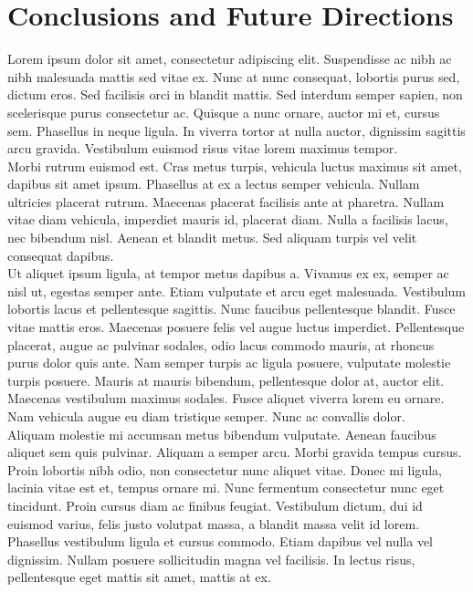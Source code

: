 \documentclass[12pt]{report}
\begin{document}
\chapter{Conclusions and Future Directions}
\bigskip
Lorem ipsum dolor sit amet, consectetur adipiscing elit. Suspendisse ac nibh ac nibh malesuada mattis sed vitae ex. Nunc at nunc consequat, lobortis purus sed, dictum eros. Sed facilisis orci in blandit mattis. Sed interdum semper sapien, non scelerisque purus consectetur ac. Quisque a nunc ornare, auctor mi et, cursus sem. Phasellus in neque ligula. In viverra tortor at nulla auctor, dignissim sagittis arcu gravida. Vestibulum euismod risus vitae lorem maximus tempor.\\

\noindent Morbi rutrum euismod est. Cras metus turpis, vehicula luctus maximus sit amet, dapibus sit amet ipsum. Phasellus at ex a lectus semper vehicula. Nullam ultricies placerat rutrum. Maecenas placerat facilisis ante at pharetra. Nullam vitae diam vehicula, imperdiet mauris id, placerat diam. Nulla a facilisis lacus, nec bibendum nisl. Aenean et blandit metus. Sed aliquam turpis vel velit consequat dapibus.\\

\noindent Ut aliquet ipsum ligula, at tempor metus dapibus a. Vivamus ex ex, semper ac nisl ut, egestas semper ante. Etiam vulputate et arcu eget malesuada. Vestibulum lobortis lacus et pellentesque sagittis. Nunc faucibus pellentesque blandit. Fusce vitae mattis eros. Maecenas posuere felis vel augue luctus imperdiet. Pellentesque placerat, augue ac pulvinar sodales, odio lacus commodo mauris, at rhoncus purus dolor quis ante. Nam semper turpis ac ligula posuere, vulputate molestie turpis posuere. Mauris at mauris bibendum, pellentesque dolor at, auctor elit. Maecenas vestibulum maximus sodales. Fusce aliquet viverra lorem eu ornare. Nam vehicula augue eu diam tristique semper. Nunc ac convallis dolor.\\

\noindent Aliquam molestie mi accumsan metus bibendum vulputate. Aenean faucibus aliquet sem quis pulvinar. Aliquam a semper arcu. Morbi gravida tempus cursus. Proin lobortis nibh odio, non consectetur nunc aliquet vitae. Donec mi ligula, lacinia vitae est et, tempus ornare mi. Nunc fermentum consectetur nunc eget tincidunt. Proin cursus diam ac finibus feugiat. Vestibulum dictum, dui id euismod varius, felis justo volutpat massa, a blandit massa velit id lorem. Phasellus vestibulum ligula et cursus commodo. Etiam dapibus vel nulla vel dignissim. Nullam posuere sollicitudin magna vel facilisis. In lectus risus, pellentesque eget mattis sit amet, mattis at ex.
\end{document}
